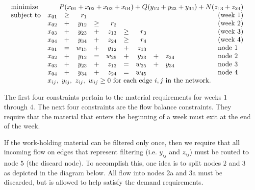\begin{enumerate}
\begin{solution}
\[
\begin{array}{lrrrrrrrrll}
\textrm{minimize} & \multicolumn{10}{r}{P(x_{01} + x_{02} + x_{03} + x_{04}) + Q(y_{12}+y_{23}+y_{34}) +N(z_{13}+z_{24})} \\
\textrm{subject to} & x_{01} & \geq & r_1 &&&&&&&\text{(week 1)}\\
& x_{02}&+&y_{12}&\geq&r_2&&&&&\text{(week 2)}\\
& x_{03}&+&y_{23}&+&z_{13}&\geq&r_3&&&\text{(week 3)}\\
& x_{04}&+&y_{34}&+&z_{24}&\geq&r_4&&&\text{(week 4)}\\
& x_{01}&=&w_{15}&+&y_{12}&+&z_{13}&&&\text{node 1}\\
& x_{02}&+&y_{12}&=&w_{25}&+&y_{23}&+&z_{24}&\text{node 2} \\
& x_{03}&+&y_{23}&+&z_{13}&=&w_{35}&+&y_{34}&\text{node 3} \\
& x_{04}&+&y_{34}&+&z_{24}&=&w_{45}&&&\text{node 4}\\
& \multicolumn{9}{r}{x_{ij},~y_{ij},~z_{ij},~w_{ij} \geq 0~\text{for each edge $i,j$ in the network.}}
\end{array}
\]

The first four constraints pertain to the material requirements for
weeks 1 through 4.  The next four constraints are the flow balance
constraints. They require that the material that enters the beginning
of a week must exit at the end of the week.

If the work-holding material can be filtered only once, then we 
require that all incoming flow on edges that represent filtering (i.e. $y_{ij}$ and
$z_{ij}$) must be routed to node 5 (the discard node). To accomplish this, one idea
is to split nodes 2 and 3 as depicted in the diagram below. All flow into nodes 2a
and 3a must be discarded, but is allowed to help satisfy the demand requirements.

\begin{center}
\end{center}
\end{solution}
\end{enumerate}
